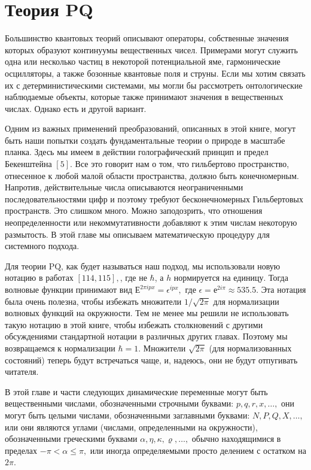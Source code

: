 \documentclass[main.tex]{subfiles}
\begin{document}
\section{Теория PQ}\label{ch16}

Большинство квантовых теорий описывают операторы, собственные значения которых образуют континуумы вещественных чисел. Примерами могут служить одна или несколько частиц в некоторой потенциальной яме, гармонические осцилляторы, а также бозонные квантовые поля и струны. Если мы хотим связать их с детерминистическими системами, мы могли бы рассмотреть онтологические наблюдаемые объекты, которые также принимают значения в вещественных числах. Однако есть и другой вариант.

Одним из важных применений преобразований, описанных в этой книге, могут быть наши попытки создать фундаментальные теории о природе в масштабе планка. Здесь мы имеем в действии голографический принцип и предел Бекенштейна $[5] .$ Все это говорит нам о том, что гильбертово пространство, отнесенное к любой малой области пространства, должно быть конечномерным. Напротив, действительные числа описываются неограниченными последовательностями цифр и поэтому требуют бесконечномерных Гильбертовых пространств. Это слишком много. Можно заподозрить, что отношения неопределенности или некоммутативности добавляют к этим числам некоторую размытость. В этой главе мы описываем математическую процедуру для системного подхода.

Для теории $\mathrm{PQ}$, как будет называться наш подход, мы использовали новую нотацию в работах $[114,115],$, где не $\hbar$, а $h$ нормируется на единицу. Тогда волновые функции принимают вид $Е^{2 \pi i p x}=\epsilon^{ipx},$ где $\epsilon=е^{2 i\pi} \approx 535.5$. Эта нотация была очень полезна, чтобы избежать множители $1 / \sqrt{2 \pi}$ для нормализации волновых функций на окружности. Тем не менее мы решили не использовать такую нотацию в этой книге, чтобы избежать столкновений с другими обсуждениями стандартной нотации в различных других главах. Поэтому мы возвращаемся к нормализации $\hbar=1 .$ Множители $\sqrt{2 \pi}$ (для нормализованных состояний) теперь будут встречаться чаще, и, надеюсь, они не будут отпугивать читателя.

В этой главе и части следующих динамические переменные могут быть вещественными числами, обозначенными строчными буквами: $p, q, r, x, \ldots,$ они могут быть целыми числами, обозначенными заглавными буквами: $N, P, Q, X, \ldots,$ или они являются углами (числами, определенными на окружности), обозначенными греческими буквами $\alpha, \eta, \kappa, \varrho, \ldots,$ обычно находящимися в пределах $-\pi<\alpha \leq \pi,$ или иногда определяемыми просто делением с остатком на $2 \pi$.
\end{document}
